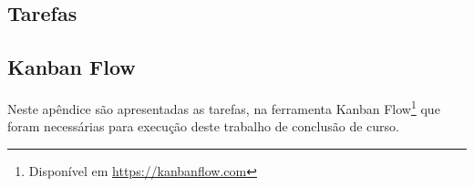 \begin{apendicesenv}

\partapendices


\chapter{Tarefas}
\section{Kanban Flow}
\label{kanban flow}

Neste apêndice são apresentadas as tarefas, na ferramenta Kanban Flow\footnote{
Disponível em \url{https://kanbanflow.com}} que foram necessárias para execução 
deste trabalho de conclusão de curso.



%

\end{apendicesenv}

